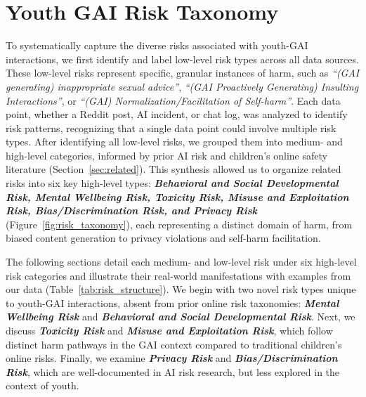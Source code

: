 \vspace{-8pt}
\section{Youth GAI Risk Taxonomy}
\vspace{-3pt}
To systematically capture the diverse risks associated with youth-GAI interactions, we first identify and label low-level risk types across all data sources. These low-level risks represent specific, granular instances of harm, such as \textit{``(GAI generating) inappropriate sexual advice''}, \textit{``(GAI Proactively Generating) Insulting Interactions''}, or \textit{``(GAI) Normalization/Facilitation of Self-harm''}. Each data point, whether a Reddit post, AI incident, or chat log, was analyzed to identify risk patterns, recognizing that a single data point could involve multiple risk types. After identifying all low-level risks, we grouped them into medium- and high-level categories, informed by prior AI risk and children's online safety literature (Section~\ref{sec:related}). This synthesis allowed us to organize related risks into six key high-level types: \textit{\textbf{Behavioral and Social Developmental Risk, Mental Wellbeing Risk, Toxicity Risk, Misuse and Exploitation Risk, Bias/Discrimination Risk, and Privacy Risk}} (Figure~\ref{fig:risk_taxonomy}), each representing a distinct domain of harm, from biased content generation to privacy violations and self-harm facilitation.

The following sections detail each medium- and low-level risk under six high-level risk categories and illustrate their real-world manifestations with examples from our data (Table~\ref{tab:risk_structure}). We begin with two novel risk types unique to youth-GAI interactions, absent from prior online risk taxonomies: \textit{\textbf{Mental Wellbeing Risk}} and \textit{\textbf{Behavioral and Social Developmental Risk}}. Next, we discuss \textit{\textbf{Toxicity Risk}} and \textit{\textbf{Misuse and Exploitation Risk}}, which follow distinct harm pathways in the GAI context compared to traditional children’s online risks. Finally, we examine \textit{\textbf{Privacy Risk}} and \textit{\textbf{Bias/Discrimination Risk}}, which are well-documented in AI risk research, but less explored in the context of youth.

